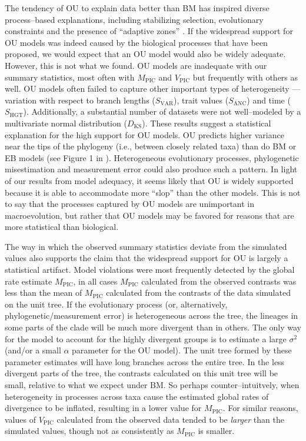 \documentclass[a4paper,12pt]{article}
\begin{document}
The tendency of OU to explain data better than BM has inspired diverse process--based explanations, including stabilizing selection, evolutionary constraints and the presence of ``adaptive zones'' \citep{HansenMartins1996, ButlerKing2004, Hansen2012book, PennellHarmon}. 
If the widespread support for OU models was indeed caused by the biological processes that have been proposed, we would expect that an OU model would also be widely adequate. However, this is not what we found. OU models are inadequate with our summary statistics, most often with $M_{\text{PIC}}$ and $V_{\text{PIC}}$ but frequently with others as well. OU models often failed to capture other important types of heterogeneity --- variation with respect to branch lengths ($S_{\text{VAR}}$), trait values ($S_{\text{ANC}}$) and time ($S_{\text{HGT}}$). Additionally, a substantial number of datasets were not well--modeled by a multivariate normal distribution ($D_{\text{KS}}$). These results suggest a statistical explanation for the high support for OU models. OU predicts higher variance near the tips of the phylogeny (i.e., between closely related taxa) than do BM or EB models (see Figure 1 in \citep{Harmon2010}). Heterogeneous evolutionary processes, phylogenetic misestimation and measurement error \citep{Houle2011, Hansen2012} could also produce such a pattern. In light of our results from model adequacy, it seems likely that OU is widely supported because it is able to accommodate more ``slop'' than the other models.  This is not to say that the processes captured by OU models are unimportant in macroevolution, but rather that OU models may be favored for reasons that are more statistical than biological.

The way in which the observed summary statistics deviate from the simulated values also supports the claim that the widespread support for OU is largely a statistical artifact. 
Model violations were most frequently detected by the global rate estimate $M_{\text{PIC}}$, in all cases $M_{\text{PIC}}$ calculated from the observed contrasts was less than the mean of $M_{\text{PIC}}$ calculated from the contrasts of the data simulated on the unit tree. If the evolutionary process (or, alternatively, phylogenetic/measurement error) is heterogeneous across the tree, the lineages in some parts of the clade will be much more divergent than in others. The only way for the model to account for the highly divergent groups is to estimate a large $\sigma^2$ (and/or a small $\alpha$ parameter for the OU model). The unit tree formed by these parameter estimates will have long branches across the entire tree. In the less divergent parts of the tree, the contrasts calculated on this unit tree will be small, relative to what we expect under BM. So perhaps counter--intuitvely, when heterogeneity in processes across taxa cause the estimated global rates of divergence to be inflated, resulting in a lower value for $M_{\text{PIC}}$. For similar reasons, values of $V_{\text{PIC}}$ calculated from the observed data tended to be \emph{larger} than the simulated values, though not as consistently as $M_{\text{PIC}}$ is smaller. 
\end{document}
